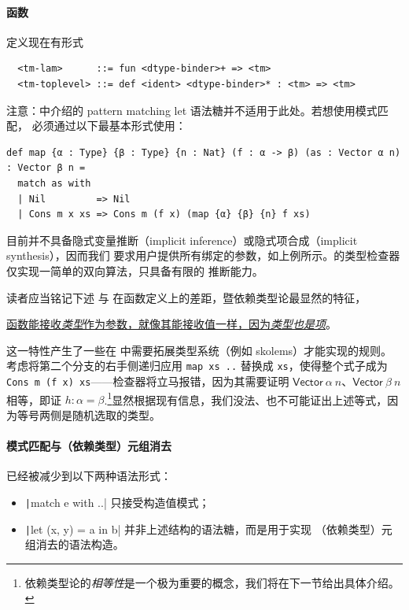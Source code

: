 \documentclass[a4paper, 11pt]{article}
\theoremstyle{remark}\newtheorem*{remark}{Remark}
\theoremstyle{definition}\newtheorem*{definition}{Definition}
\begin{document}
\paragraph{函数} 定义现在有形式
\begin{verbatim}
  <tm-lam>      ::= fun <dtype-binder>+ => <tm>
  <tm-toplevel> ::= def <ident> <dtype-binder>* : <tm> => <tm>
\end{verbatim}
注意：\Tigris 中介绍的 pattern matching let 语法糖并不适用于此处。若想使用模式匹配，
必须通过以下最基本形式使用：

\begin{verbatim}
def map {α : Type} {β : Type} {n : Nat} (f : α -> β) (as : Vector α n) : Vector β n =
  match as with
  | Nil         => Nil
  | Cons m x xs => Cons m (f x) (map {α} {β} {n} f xs)
\end{verbatim}

\Tigrisd 目前并不具备隐式变量推断（implicit inference）或隐式项合成（implicit synthesis），因而我们
要求用户提供所有绑定的参数，如上例所示。\Tigrisd 的类型检查器仅实现一简单的双向算法，只具备有限的
推断能力。

读者应当铭记下述 \Tigris 与 \Tigrisd 在函数定义上的差距，暨依赖类型论最显然的特征，
\begin{center}
\underline{函数能接收\emph{类型}作为参数，就像其能接收值一样，因为\emph{类型也是项}}。
\end{center}
这一特性产生了一些在 \Tigris 中需要拓展类型系统（例如 skolems）才能实现的规则。考虑将第二个分支的右手侧递归应用 \texttt{map xs ..} 替换成
\texttt{xs}，使得整个式子成为 \texttt{Cons m (f x) xs}——检查器将立马报错，因为其需要证明 $\mathsf{Vector}\ \alpha\ n$、$\mathsf{Vector}\ \beta\ n$
相等，即证 $h : \alpha=\beta$.\footnote{
依赖类型论的\emph{相等性}是一个极为重要的概念，我们将在下一节给出具体介绍。
}显然根据现有信息，我们没法、也不可能证出上述等式，因为等号两侧是随机选取的类型。

\paragraph{模式匹配与（依赖类型）元组消去} 已经被减少到以下两种语法形式：
\begin{itemize}
\item \texttt|match e with ..| 只接受构造值模式；
\item \texttt|let (x, y) = a in b| 并非上述结构的语法糖，而是用于实现
（依赖类型）元组消去的语法构造。
\end{itemize}
\end{document}
